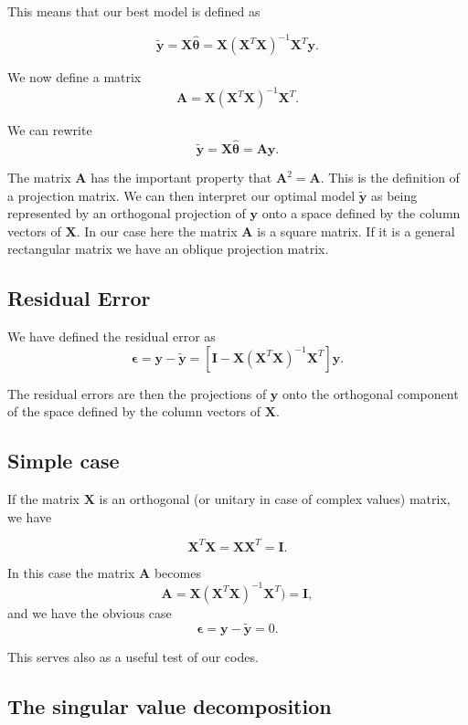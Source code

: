 \documentclass[%
oneside,                 %
final,                   %
10pt]{article}
\begin{document}
This means that our best model is defined as

\[
\tilde{\bm{y}}=\bm{X}\hat{\bm{\theta}} = \bm{X}\left(\bm{X}^T\bm{X}\right)^{-1}\bm{X}^T\bm{y}.
\]

We now define a matrix
\[
\bm{A}=\bm{X}\left(\bm{X}^T\bm{X}\right)^{-1}\bm{X}^T.
\]

We can rewrite
\[
\tilde{\bm{y}}=\bm{X}\hat{\bm{\theta}} = \bm{A}\bm{y}.
\]

The matrix $\bm{A}$ has the important property that $\bm{A}^2=\bm{A}$. This is the definition of a projection matrix.
We can then interpret our optimal model $\tilde{\bm{y}}$ as being represented  by an orthogonal  projection of $\bm{y}$ onto a space defined by the column vectors of $\bm{X}$.  In our case here the matrix $\bm{A}$ is a square matrix. If it is a general rectangular matrix we have an oblique projection matrix.

\subsection*{Residual Error}

We have defined the residual error as
\[
\bm{\epsilon}=\bm{y}-\tilde{\bm{y}}=\left[\bm{I}-\bm{X}\left(\bm{X}^T\bm{X}\right)^{-1}\bm{X}^T\right]\bm{y}.
\]

The residual errors are then the projections of $\bm{y}$ onto the orthogonal component of the space defined by the column vectors of $\bm{X}$.

\subsection*{Simple case}

If the matrix $\bm{X}$ is an orthogonal (or unitary in case of complex values) matrix, we have

\[
\bm{X}^T\bm{X}=\bm{X}\bm{X}^T = \bm{I}.
\]

In this case the matrix $\bm{A}$ becomes
\[
\bm{A}=\bm{X}\left(\bm{X}^T\bm{X}\right)^{-1}\bm{X}^T)=\bm{I},
\]
and we have the obvious case
\[
\bm{\epsilon}=\bm{y}-\tilde{\bm{y}}=0.
\]

This serves also as a useful test of our codes. 

\subsection*{The singular value decomposition}


\end{document}

